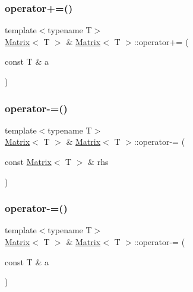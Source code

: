 \mbox{\label{classMatrix_a5aeaf1a90547b2288646d57143d5518c}} 
\subsubsection{\texorpdfstring{operator+=()}{operator+=()}\hspace{0.1cm}{\footnotesize\ttfamily [2/2]}}
{\footnotesize\ttfamily template$<$typename T$>$ \\
\mbox{\hyperlink{classMatrix}{Matrix}}$<$ T $>$ \& \mbox{\hyperlink{classMatrix}{Matrix}}$<$ T $>$\+::operator+= (\begin{DoxyParamCaption}\item[{const T \&}]{a }\end{DoxyParamCaption})\hspace{0.3cm}{\ttfamily [inline]}}

\mbox{\label{classMatrix_a50e2998bc90012d77efc0ff39d089336}} 
\subsubsection{\texorpdfstring{operator-\/=()}{operator-=()}\hspace{0.1cm}{\footnotesize\ttfamily [1/2]}}
{\footnotesize\ttfamily template$<$typename T$>$ \\
\mbox{\hyperlink{classMatrix}{Matrix}}$<$ T $>$ \& \mbox{\hyperlink{classMatrix}{Matrix}}$<$ T $>$\+::operator-\/= (\begin{DoxyParamCaption}\item[{const \mbox{\hyperlink{classMatrix}{Matrix}}$<$ T $>$ \&}]{rhs }\end{DoxyParamCaption})\hspace{0.3cm}{\ttfamily [inline]}}

\mbox{\label{classMatrix_a8776d41fcbbc1fc08425492576cf6786}} 
\subsubsection{\texorpdfstring{operator-\/=()}{operator-=()}\hspace{0.1cm}{\footnotesize\ttfamily [2/2]}}
{\footnotesize\ttfamily template$<$typename T$>$ \\
\mbox{\hyperlink{classMatrix}{Matrix}}$<$ T $>$ \& \mbox{\hyperlink{classMatrix}{Matrix}}$<$ T $>$\+::operator-\/= (\begin{DoxyParamCaption}\item[{const T \&}]{a }\end{DoxyParamCaption})\hspace{0.3cm}{\ttfamily [inline]}}

